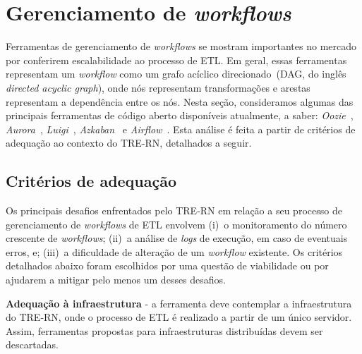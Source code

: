 \section{Gerenciamento de \textit{workflows}}

Ferramentas de gerenciamento de \textit{workflows} se mostram importantes no mercado por conferirem escalabilidade ao processo de ETL. Em geral, essas ferramentas representam um \textit{workflow} como um grafo acíclico direcionado~(DAG, do inglês \textit{directed acyclic graph}), onde nós representam transformações e arestas representam a dependência entre os nós.
Nesta seção, consideramos algumas das principais ferramentas de código aberto disponíveis atualmente, a saber: \textit{Oozie}~\cite{ooziewebsite}, \textit{Aurora}~\cite{aurorawebsite}, \textit{Luigi}~\cite{luigigit}, \textit{Azkaban}~\cite{azakbanwebsite} e \textit{Airflow}~\cite{airflowwebsite}. Esta análise é feita a partir de critérios de adequação ao contexto do TRE-RN, detalhados a seguir.


\subsection{Critérios de adequação}

Os principais desafios enfrentados pelo TRE-RN em relação a seu processo de gerenciamento de \textit{workflows} de ETL envolvem (i)~o monitoramento do número crescente de \textit{workflows}; (ii)~a análise de \textit{logs} de execução, em caso de eventuais erros, e; (iii)~a dificuldade de alteração de um \textit{workflow} existente. Os critérios detalhados abaixo foram escolhidos por uma questão de viabilidade ou por ajudarem a mitigar pelo menos um desses desafios. 

\textbf{Adequação à infraestrutura} - a ferramenta deve contemplar a infraestrutura do TRE-RN, onde o processo de ETL é realizado a partir de um único servidor. Assim, ferramentas propostas para infraestruturas distribuídas devem ser descartadas.  

